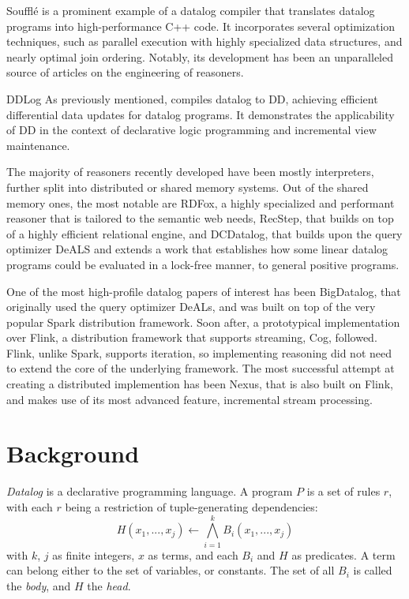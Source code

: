 \documentclass[sigconf,screen,review,natbib]{acmart}
\theoremstyle{definition}
\begin{document}
Soufflé is a prominent example of a datalog compiler that translates datalog programs into high-performance
C++ code. It incorporates several optimization techniques, such as parallel execution with highly specialized data
structures\cite{souffle_btree}, and nearly optimal join ordering\cite{souffle_join}. Notably, its development has
been an unparalleled source of articles on the engineering of reasoners.

DDLog As previously mentioned, compiles datalog to DD, achieving efficient differential data updates
for datalog programs. It demonstrates the applicability of DD in the context of declarative logic
programming and incremental view maintenance.

The majority of reasoners recently developed have been mostly interpreters, further split into distributed or
shared memory systems. Out of the shared memory ones, the most notable are RDFox\cite{rdfox}, a highly specialized
and performant reasoner that is tailored to the semantic web needs, RecStep\cite{recstep}, that builds on top of a
highly efficient relational engine, and DCDatalog\cite{dcdatalog}, that builds upon the query optimizer DeALS\cite{deals}
and extends a work that establishes how some linear datalog programs could be evaluated in a lock-free manner, to
general positive programs.

One of the most high-profile datalog papers of interest has been BigDatalog\cite{bigdatalog}, that
originally used the query optimizer DeALs, and was built on top of the very popular Spark\cite{spark}
distribution framework. Soon after, a prototypical implementation\cite{cog} over Flink\cite{flink},
a distribution framework that supports streaming, Cog, followed. Flink, unlike Spark, supports
iteration, so implementing reasoning did not need to extend the core of the underlying framework. The most
successful attempt at creating a distributed implemention has been Nexus\cite{nexus}, that is also built on Flink,
and makes use of its most advanced feature, incremental stream processing.
\section{Background}
\textit{Datalog}\cite{datalog} is a declarative programming language. A program $P$ is a set of
rules $r$, with each $r$ being a restriction of tuple-generating dependencies: \[H(x_1, ..., x_j) \leftarrow \bigwedge_{i=1}^kB_i(x_1, ..., x_j) \]
with $k$, $j$ as finite integers, $x$ as terms, and each $B_i$ and $H$ as predicates. A term can belong
either to the set of variables, or constants. The set of all $B_i$ is called the \textit{body}, and $H$ the \textit{head}.
\end{document}
